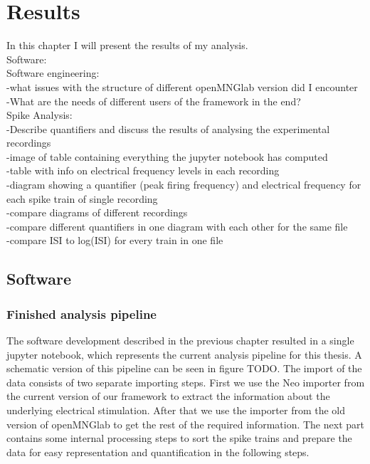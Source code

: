 \chapter{Results}

In this chapter I will present the results of my analysis.\\
Software:\\
Software engineering:\\
-what issues with the structure of different openMNGlab version did I encounter\\
-What are the needs of different users of the framework in the end?\\

Spike Analysis:\\
-Describe quantifiers and discuss the results of analysing the experimental recordings\\
-image of table containing everything the jupyter notebook has computed\\
-table with info on electrical frequency levels in each recording\\
-diagram showing a quantifier (peak firing frequency) and electrical frequency for each spike train of single recording\\
-compare diagrams of different recordings\\
-compare different quantifiers in one diagram with each other for the same file\\
-compare ISI to log(ISI) for every train in one file\\

\section{Software}
\subsection{Finished analysis pipeline}
The software development described in the previous chapter resulted in a single jupyter notebook, which represents the current analysis pipeline for this thesis. A schematic version of this pipeline can be seen in figure TODO. The import of the data consists of two separate importing steps. First we use the Neo importer from the current version of our framework to extract the information about the underlying electrical stimulation. After that we use the importer from the old version of openMNGlab to get the rest of the required information. The next part contains some internal processing steps to sort the spike trains and prepare the data for easy representation and quantification in the following steps.



